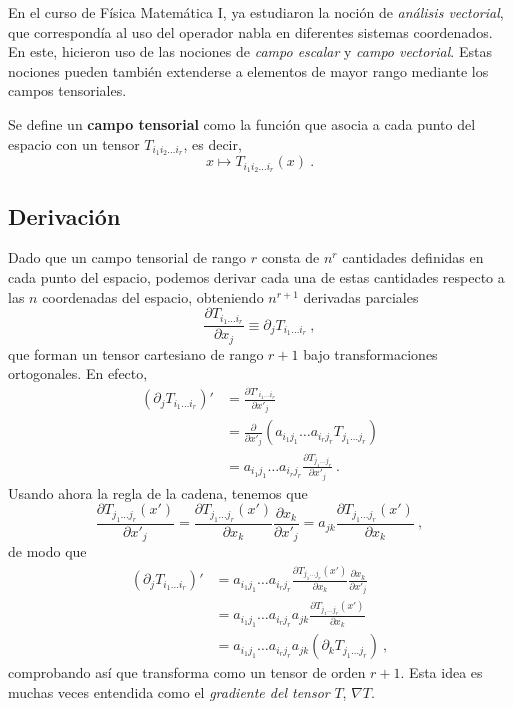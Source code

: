 En el curso de Física Matemática I, ya estudiaron la noción de \emph{análisis vectorial}, que correspondía al uso del operador nabla en diferentes sistemas coordenados. En este, hicieron uso de las nociones de \emph{campo escalar} y \emph{campo vectorial}. Estas nociones pueden también extenderse a elementos de mayor rango mediante los campos tensoriales.
\begin{defi} 
    Se define un \textbf{campo tensorial} como la función que asocia a cada punto del espacio con un tensor $T_{i_1 i_2 \dots i_r}$, es decir,
    \begin{equation}
        x \mapsto T_{i_1 i_2 \dots i_r}(x) \ .
    \end{equation}
\end{defi}

\subsection{Derivación}

Dado que un campo tensorial de rango $r$ consta de $n^r$ cantidades definidas en cada punto del espacio, podemos derivar cada una de estas cantidades respecto a las $n$ coordenadas del espacio, obteniendo $n^{r+1}$ derivadas parciales
\begin{equation}
    \frac{\partial T_{i_1 \dots i_r}}{\partial x_j} \equiv \partial_j T_{i_1 \dots i_r} \ ,
\end{equation}
que forman un tensor cartesiano de rango $r+1$ bajo transformaciones ortogonales. En efecto,
\begin{align}
    (\partial_j T_{i_1 \dots i_r})' & = \frac{\partial T'_{i_1 \dots i_r}}{\partial x'_j} \\
    & = \frac{\partial}{\partial x'_j}(a_{i_1 j_1} \dots a_{i_r j_r} T_{j_1 \dots j_r}) \\
    & = a_{i_1 j_1} \dots a_{i_r j_r} \frac{\partial T_{j_1 \dots j_r}}{\partial x'_j} \ .
\end{align}
Usando ahora la regla de la cadena, tenemos que
\begin{equation}
    \frac{\partial T_{j_1 \dots j_r}(x')}{\partial x'_j} = \frac{\partial T_{j_1 \dots j_r}(x')}{\partial x_k} \frac{\partial x_k}{\partial x'_j} = a_{jk} \frac{\partial T_{j_1 \dots j_r}(x')}{\partial x_k}\ ,
\end{equation}
de modo que
\begin{align}
    (\partial_j T_{i_1 \dots i_r})' & = a_{i_1 j_1} \dots a_{i_r j_r} \frac{\partial T_{j_1 \dots j_r}(x')}{\partial x_k} \frac{\partial x_k}{\partial x'_j} \\
    & = a_{i_1 j_1} \dots a_{i_r j_r}  a_{jk} \frac{\partial T_{j_1 \dots j_r}(x')}{\partial x_k} \\
    & = a_{i_1 j_1} \dots a_{i_r j_r}  a_{jk} (\partial_k T_{j_1 \dots j_r}) \ ,
\end{align}
comprobando así que transforma como un tensor de orden $r+1$. Esta idea es muchas veces entendida como el \emph{gradiente del tensor} $T$, $\nabla T$.

